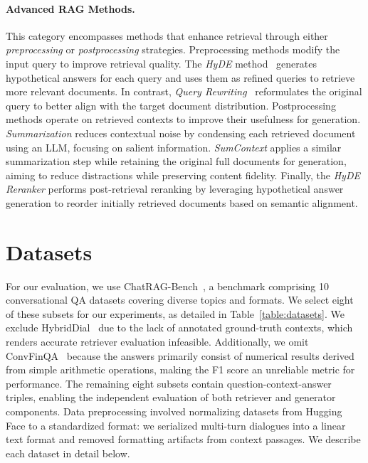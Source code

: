 \documentclass[11pt]{article}
\begin{document}
\paragraph{Advanced RAG Methods.}
This category encompasses methods that enhance retrieval through either \emph{preprocessing} or \emph{postprocessing} strategies. Preprocessing methods modify the input query to improve retrieval quality. The \emph{HyDE} method~\cite{gao_precise_2023} generates hypothetical answers for each query and uses them as refined queries to retrieve more relevant documents. In contrast, \emph{Query Rewriting}~\cite{ye_enhancing_2023} reformulates the original query to better align with the target document distribution. Postprocessing methods operate on retrieved contexts to improve their usefulness for generation. \emph{Summarization} reduces contextual noise by condensing each retrieved document using an LLM, focusing on salient information. \emph{SumContext} applies a similar summarization step while retaining the original full documents for generation, aiming to reduce distractions while preserving content fidelity. Finally, the \emph{HyDE Reranker} performs post-retrieval reranking by leveraging hypothetical answer generation to reorder initially retrieved documents based on semantic alignment.






\section{Datasets}\label{sec:datasets}

For our evaluation, we use ChatRAG-Bench~\cite{liu_chatqa_2024}, a benchmark comprising 10 conversational QA datasets covering diverse topics and formats. We select eight of these subsets for our experiments, as detailed in Table~\ref{table:datasets}. We exclude HybridDial~\cite{nakamura_hybridialogue_2022} due to the lack of annotated ground-truth contexts, which renders accurate retriever evaluation infeasible. Additionally, we omit ConvFinQA~\cite{chen_convfinqa_2022} because the answers primarily consist of numerical results derived from simple arithmetic operations, making the F1 score an unreliable metric for performance. The remaining eight subsets contain question-context-answer triples, enabling the independent evaluation of both retriever and generator components. Data preprocessing involved normalizing datasets from Hugging Face to a standardized format: we serialized multi-turn dialogues into a linear text format and removed formatting artifacts from context passages.
We describe each dataset in detail below.
\end{document}
